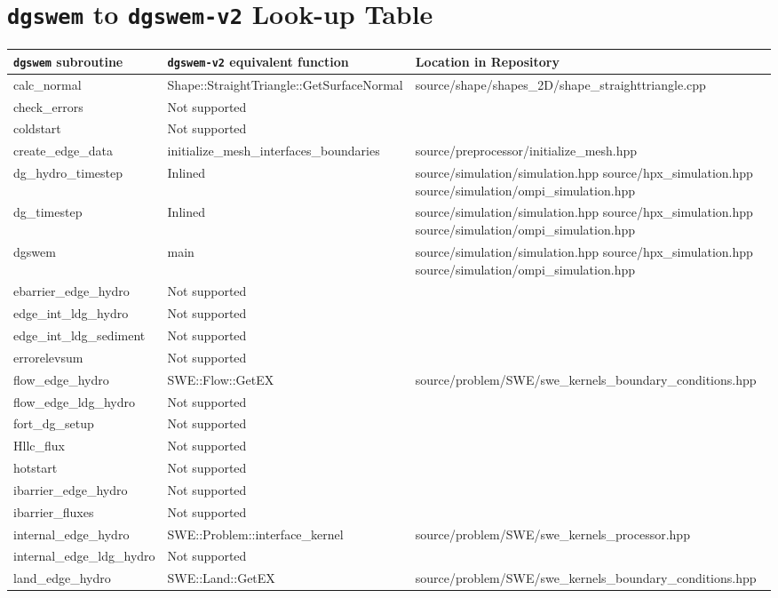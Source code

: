 \chapter{\texttt{dgswem} to \texttt{dgswem-v2} Look-up Table}

\setlength\LTleft{-3.2cm}
{ \scriptsize
\begin{longtable}{ l | p{55mm} | p{86mm} }
\hline
\hline
{\normalsize \texttt{dgswem} subroutine} & {\normalsize \texttt{dgswem-v2} equivalent function} & 
{\normalsize Location in Repository }
\tabularnewline \hline
calc\_normal	& Shape::StraightTriangle::GetSurfaceNormal	& source/shape/shapes\_2D/shape\_straighttriangle.cpp
\tabularnewline \hline
check\_errors & Not supported &
\tabularnewline \hline	
coldstart & Not supported &
\tabularnewline \hline	
create\_edge\_data & initialize\_mesh\_interfaces\_boundaries & source/preprocessor/initialize\_mesh.hpp
\tabularnewline \hline
dg\_hydro\_timestep & Inlined	& source/simulation/simulation.hpp \newline source/hpx\_simulation.hpp \newline source/simulation/ompi\_simulation.hpp
\tabularnewline \hline
dg\_timestep	& Inlined & source/simulation/simulation.hpp \newline source/hpx\_simulation.hpp \newline source/simulation/ompi\_simulation.hpp
\tabularnewline \hline
dgswem & main & source/simulation/simulation.hpp \newline source/hpx\_simulation.hpp \newline source/simulation/ompi\_simulation.hpp
\tabularnewline \hline
ebarrier\_edge\_hydro	& Not supported &	
\tabularnewline \hline
edge\_int\_ldg\_hydro & Not supported &
\tabularnewline \hline
edge\_int\_ldg\_sediment & Not supported &	
\tabularnewline \hline
errorelevsum & Not supported &
\tabularnewline \hline
flow\_edge\_hydro & SWE::Flow::GetEX & source/problem/SWE/swe\_kernels\_boundary\_conditions.hpp
\tabularnewline \hline
flow\_edge\_ldg\_hydro	& Not supported &
\tabularnewline \hline
fort\_dg\_setup & Not supported &	
\tabularnewline \hline
Hllc\_flux & Not supported &
\tabularnewline \hline
hotstart & Not supported &	
\tabularnewline \hline
ibarrier\_edge\_hydro	& Not supported &	
\tabularnewline \hline
ibarrier\_fluxes & Not supported &
\tabularnewline \hline
internal\_edge\_hydro & SWE::Problem::interface\_kernel & source/problem/SWE/swe\_kernels\_processor.hpp
\tabularnewline \hline
internal\_edge\_ldg\_hydro & Not supported &
\tabularnewline \hline
land\_edge\_hydro & SWE::Land::GetEX & source/problem/SWE/swe\_kernels\_boundary\_conditions.hpp

\end{longtable}}
